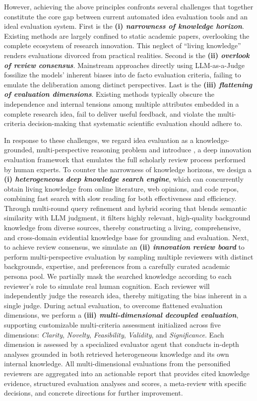 However, achieving the above principles confronts several challenges that together constitute the core gap between current automated idea evaluation tools \cite{scholareval,opennovelty,litllms,grapheval,idea-novel-checker} and an ideal evaluation system.
First is the \textbf{(i) \textit{narrowness of knowledge horizon}}.
Existing methods are largely confined to static academic papers, overlooking the complete ecosystem of research innovation.
This neglect of ``living knowledge'' renders evaluations divorced from practical realities.
Second is the \textbf{(ii) \textit{overlook of review consensus}}.
Mainstream approaches directly using LLM-as-a-Judge fossilize the models' inherent biases into de facto evaluation criteria, failing to emulate the deliberation among distinct perspectives.
Last is the \textbf{(iii) \textit{flattening of evaluation dimensions}}.
Existing methods typically obscure the independence and internal tensions among multiple attributes embedded in a complete research idea, fail to deliver useful feedback, and violate the multi-criteria decision-making that systematic scientific evaluation should adhere to.

In response to these challenges, we regard idea evaluation as a knowledge-grounded,
multi-perspective reasoning problem and introduce \textbf{\ours}, a deep innovation evaluation framework that emulates the full scholarly review process performed by human experts.
To counter the narrowness of knowledge horizons, we design a \textbf{(i) \textit{heterogeneous deep knowledge search engine}}, which can concurrently obtain living knowledge from online literature, web opinions, and code repos, combining fast search with slow reading for both effectiveness and efficiency.
Through multi-round query refinement and hybrid scoring that blends semantic similarity with LLM judgment, it filters highly relevant, high-quality background knowledge from diverse sources, thereby constructing a living, comprehensive, and cross-domain evidential knowledge base for grounding and evaluation.
Next, to achieve review consensus, we simulate an \textbf{(ii) \textit{innovation review board}} to perform multi-perspective evaluation by sampling multiple reviewers with distinct backgrounds, expertise, and preferences from a carefully curated academic persona pool.
We partially mask the searched knowledge according to each reviewer's role to simulate real human cognition.
Each reviewer will independently judge the research idea, thereby mitigating the bias inherent in a single judge.
During actual evaluation, to overcome flattened evaluation dimensions, we perform a \textbf{(iii) \textit{multi-dimensional decoupled evaluation}}, supporting customizable multi-criteria assessment initialized across five dimensions: \textit{Clarity}, \textit{Novelty}, \textit{Feasibility}, \textit{Validity}, and \textit{Significance}. Each dimension is assessed by a specialized evaluator agent that conducts in-depth analyses grounded in both retrieved heterogeneous knowledge and its own internal knowledge.
All multi-dimensional evaluations from the personified reviewers are aggregated into an actionable report that provides cited knowledge evidence, structured evaluation analyses and scores, a meta-review with specific decisions, and concrete directions for further improvement.

